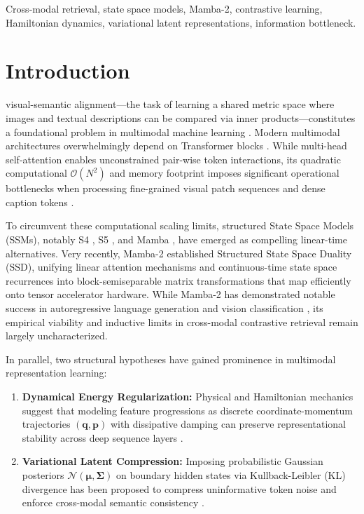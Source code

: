 \documentclass[journal]{IEEEtran}
\begin{document}
\begin{IEEEkeywords}
Cross-modal retrieval, state space models, Mamba-2, contrastive learning, Hamiltonian dynamics, variational latent representations, information bottleneck.
\end{IEEEkeywords}

\IEEEpeerreviewmaketitle

\section{Introduction}
 visual-semantic alignment—the task of learning a shared metric space where images and textual descriptions can be compared via inner products—constitutes a foundational problem in multimodal machine learning \cite{radford2021learning, faghri2017vse++, lee2018stacked}. Modern multimodal architectures overwhelmingly depend on Transformer blocks \cite{vaswani2017attention, dosovitskiy2020image, liu2019roberta}. While multi-head self-attention enables unconstrained pair-wise token interactions, its quadratic computational $\mathcal{O}(N^2)$ and memory footprint imposes significant operational bottlenecks when processing fine-grained visual patch sequences and dense caption tokens \cite{zhu2024vision, liu2024vmamba}.

To circumvent these computational scaling limits, structured State Space Models (SSMs), notably S4 \cite{gu2021efficiently}, S5 \cite{smith2022simplified}, and Mamba \cite{gu2023mamba}, have emerged as compelling linear-time alternatives. Very recently, Mamba-2 \cite{dao2024transformers} established Structured State Space Duality (SSD), unifying linear attention mechanisms and continuous-time state space recurrences into block-semiseparable matrix transformations that map efficiently onto tensor accelerator hardware. While Mamba-2 has demonstrated notable success in autoregressive language generation and vision classification \cite{zhu2024vision, liu2024vmamba}, its empirical viability and inductive limits in cross-modal contrastive retrieval remain largely uncharacterized.

In parallel, two structural hypotheses have gained prominence in multimodal representation learning:
\begin{enumerate}
    \item \textbf{Dynamical Energy Regularization:} Physical and Hamiltonian mechanics suggest that modeling feature progressions as discrete coordinate-momentum trajectories $(\mathbf{q}, \mathbf{p})$ with dissipative damping can preserve representational stability across deep sequence layers \cite{greydanus2019hamiltonian, chen2018neural, ruthotto2020deep}.
    \item \textbf{Variational Latent Compression:} Imposing probabilistic Gaussian posteriors $\mathcal{N}(\boldsymbol{\mu}, \boldsymbol{\Sigma})$ on boundary hidden states via Kullback-Leibler (KL) divergence has been proposed to compress uninformative token noise and enforce cross-modal semantic consistency \cite{kingma2013auto, higgins2016beta, alemi2016deep}.
\end{enumerate}
\end{document}
